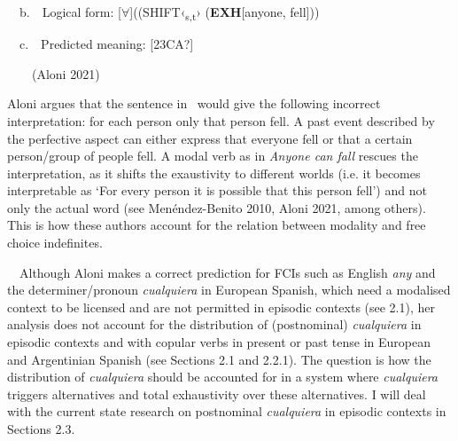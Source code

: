 \begin{styleStandard}
\ \ b.\ \ Logical form: [${\forall}$]((\textsc{SHIFT}‹\textsubscript{s,t}› (\textbf{EXH}[anyone, fell]))
\end{styleStandard}

\begin{styleStandard}
\ \ c.\ \ Predicted meaning: [23CA?]
\end{styleStandard}

\begin{styleStandard}
\ \ \ \ (Aloni 2021)
\end{styleStandard}

\begin{styleStandard}
Aloni argues that the sentence in \ would give the following incorrect interpretation: for each person only that person fell. A past event described by the perfective aspect can either express that everyone fell or that a certain person/group of people fell. A modal verb as in \textit{Anyone can fall} rescues the interpretation, as it shifts the exaustivity to different worlds (i.e. it becomes interpretable as ‘For every person it is possible that this person fell’) and not only the actual word (see Menéndez-Benito 2010, Aloni 2021, among others). This is how these authors account for the relation between modality and free choice indefinites.
\end{styleStandard}

\begin{styleStandard}
\ \ Although Aloni makes a correct prediction for FCIs such as English \textit{any} and the determiner/pronoun\textit{ cualquiera} in European Spanish, which need a modalised context to be licensed and are not permitted in episodic contexts (see 2.1), her analysis does not account for the distribution of (postnominal) \textit{cualquiera} in episodic contexts and with copular verbs in present or past tense in European and Argentinian Spanish (see Sections 2.1 and 2.2.1). The question is how the distribution of \textit{cualquiera} should be accounted for in a system where \textit{cualquiera} triggers alternatives and total exhaustivity over these alternatives. I will deal with the current state research on postnominal \textit{cualquiera} in episodic contexts in Sections 2.3.
\end{styleStandard}

